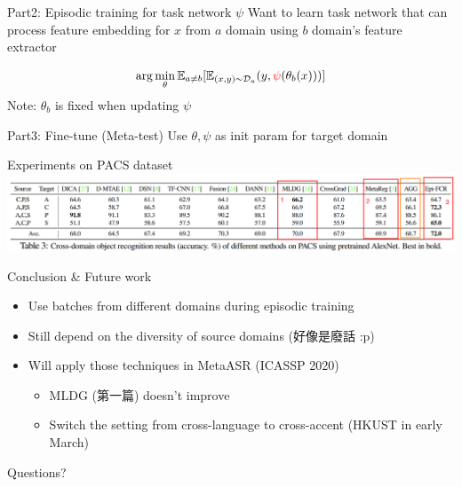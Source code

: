 \documentclass{beamer}
\begin{document}
\begin{frame}[t]{Part2: Episodic training for task network $\psi$}
  Want to learn task network that can process feature embedding for $x$ from $a$ domain using $b$ domain's feature extractor

  \begin{equation*}
    \arg \min_\theta \mathbb{E}_{ a \neq b} [\mathbb{E}_{(x,y) \sim \mathcal{D}_a}(y, {\color{red}{\psi}}(\theta_b(x)))] 
  \end{equation*}
    Note: $\theta_b$ is fixed when updating $\psi$
\end{frame}

\begin{frame}{Part3: Fine-tune (Meta-test)}
  Use $\theta, \psi$ as init param for target domain
\end{frame}

\begin{frame}[t]{Experiments on PACS dataset}
  \includegraphics[width=\textwidth]{fig/pacs-exp.png}
\end{frame}

\begin{frame}{Conclusion \& Future work}
  \begin{itemize}
    \item Use batches from different domains during episodic training
    \item Still depend on the diversity of source domains (好像是廢話 :p)
    \item Will apply those techniques in MetaASR (ICASSP 2020)
        \begin{itemize}
          \item MLDG (第一篇) doesn't improve 
          \item Switch the setting from cross-language to cross-accent (HKUST in early March)
        \end{itemize}
  \end{itemize}
\end{frame}

\begin{frame}
	\begin{center}
    \LARGE{Questions?}
	\end{center}
\end{frame}
\end{document}
